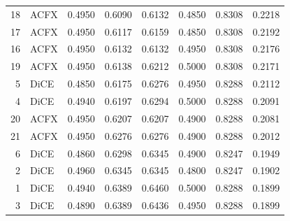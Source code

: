 \begin{tabular}{rlrrrrrr}
    18 &   ACFX &      0.4950 &            0.6090 &                     0.6132 &                   0.4850 &               0.8308 &                   0.2218 \\
    17 &   ACFX &      0.4950 &            0.6117 &                     0.6159 &                   0.4850 &               0.8308 &                   0.2192 \\
    16 &   ACFX &      0.4950 &            0.6132 &                     0.6132 &                   0.4950 &               0.8308 &                   0.2176 \\
    19 &   ACFX &      0.4950 &            0.6138 &                     0.6212 &                   0.5000 &               0.8308 &                   0.2171 \\
     5 &   DiCE &      0.4850 &            0.6175 &                     0.6276 &                   0.4950 &               0.8288 &                   0.2112 \\
     4 &   DiCE &      0.4940 &            0.6197 &                     0.6294 &                   0.5000 &               0.8288 &                   0.2091 \\
    20 &   ACFX &      0.4950 &            0.6207 &                     0.6207 &                   0.4900 &               0.8288 &                   0.2081 \\
    21 &   ACFX &      0.4950 &            0.6276 &                     0.6276 &                   0.4900 &               0.8288 &                   0.2012 \\
     6 &   DiCE &      0.4860 &            0.6298 &                     0.6345 &                   0.4900 &               0.8247 &                   0.1949 \\
     2 &   DiCE &      0.4960 &            0.6345 &                     0.6345 &                   0.4800 &               0.8247 &                   0.1902 \\
     1 &   DiCE &      0.4940 &            0.6389 &                     0.6460 &                   0.5000 &               0.8288 &                   0.1899 \\
     3 &   DiCE &      0.4890 &            0.6389 &                     0.6436 &                   0.4950 &               0.8288 &                   0.1899 \\
\bottomrule
\end{tabular}
